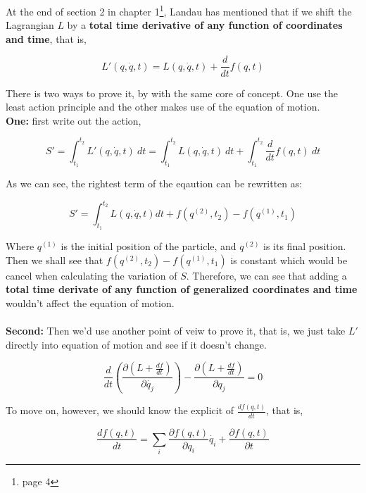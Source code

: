 \documentclass[12pt]{article}
\begin{document}
At the end of section 2 in chapter 1\footnote{page 4}, Landau has mentioned that if we shift the Lagrangian $L$ by a \textbf{total time derivative of any function of coordinates and time}, that is,

\begin{center}
    \[L'(q, \dot{q}, t) = L(q, \dot{q}, t) + \frac{d}{dt}f(q, t)\]
\end{center}

There is two ways to prove it, by with the same core of concept. One use the least action principle and the other makes use of the equation of motion.
\\
\textbf{One:} first write out the action,

\begin{center}
    \[S' = \int_{t_1}^{t_2} L'(q, \dot{q}, t)\ dt = \int_{t_1}^{t_2} L(q, \dot{q}, t)\ dt + \int_{t_1}^{t_2} \frac{d}{dt}f(q, t)\ dt\]
\end{center}

As we can see, the rightest term of the eqaution can be rewritten as:

\begin{center}
    \[S' = \int_{t_1}^{t_2} L(q, \dot{q}, t) dt + f(q^{(2)}, t_2) - f(q^{(1)}, t_1)\]
\end{center}

Where $q^{(1)}$ is the initial position of the particle, and $q^{(2)}$ is its final position. Then we shall see that $f(q^{(2)}, t_2) - f(q^{(1)}, t_1)$ is constant which would be cancel when calculating the variation of $S$. Therefore, we can see that adding a \textbf{total time derivate of any function of generalized coordinates and time }wouldn't affect the equation of motion.
\\\\
\textbf{Second:}  Then we'd use another point of veiw to prove it, that is, we just take $L'$ directly into equation of motion and see if it doesn't change.

\begin{center}
    \[ \frac{d}{dt} \left( \frac{ \partial{(L + \frac{df}{dt})} }{\partial{\dot{q_j}}} \right) - \frac{ \partial{(L+\frac{df}{dt})} }{ \partial{q_j} } = 0 \]
\end{center}

To move on, however, we should  know the explicit of $\frac{df(q, t)}{dt}$, that is,

\begin{center}
    \[ \frac{df(q, t)}{dt} = \sum_{i} \frac{ \partial{f(q, t)} }{ \partial{q_i} }\dot{q_i} + \frac{ \partial{f(q, t)} }{ \partial{t} } \]
\end{center}
\end{document}
